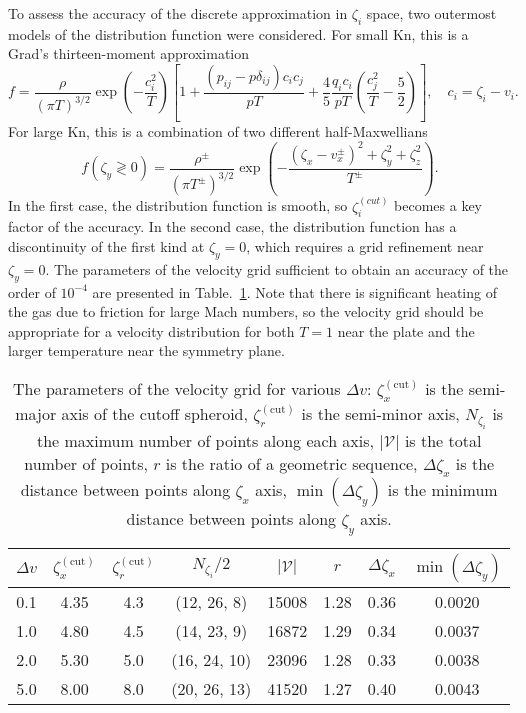 \documentclass[aip,pof,preprint]{revtex4-1}
\newcommand{\Kn}{\mathrm{Kn}}
\begin{document}
To assess the accuracy of the discrete approximation in \(\zeta_i\) space,
two outermost models of the distribution function were considered.
For small \(\Kn\), this is a Grad's thirteen-moment approximation
\begin{equation}\label{eq:grad13}
    f = \frac{\rho}{(\pi T)^{3/2}}\exp\left(-\frac{c_i^2}{ T}\right)
    \left[ 1 + \frac{(p_{ij}-p\delta_{ij})c_ic_j}{pT} + \frac4{5}\frac{q_ic_i}{pT}\left(\frac{c_j^2}{T}-\frac5{2}\right) \right],
    \quad c_i = \zeta_i - v_i.
\end{equation}
For large \(\Kn\), this is a combination of two different half-Maxwellians
\begin{equation}\label{eq:double_Maxwell}
    f(\zeta_y\gtrless0) = \frac{\rho^\pm}{(\pi T^\pm)^{3/2}}\exp\left(-\frac{(\zeta_x-v_x^\pm)^2+\zeta_y^2+\zeta_z^2}{T^\pm}\right).
\end{equation}
In the first case, the distribution function is smooth,
so \(\zeta_i^{(cut)}\) becomes a key factor of the accuracy.
In the second case, the distribution function has a discontinuity of the first kind at \(\zeta_y=0\),
which requires a grid refinement near \(\zeta_y=0\).
The parameters of the velocity grid sufficient to obtain an accuracy of the order of \(10^{-4}\)
are presented in Table.~\ref{table:velocity_grid}.
Note that there is significant heating of the gas due to friction for large Mach numbers,
so the velocity grid should be appropriate for a velocity distribution
for both \(T=1\) near the plate and the larger temperature near the symmetry plane.

\begin{table}
    \centering
    \begin{tabular}{|c|c|c|c|c|c|c|c|}
        \hline
        \(\Delta{v}\) & \(\zeta^{(\mathrm{cut})}_x\) & \(\zeta^{(\mathrm{cut})}_r\)
            & \(N_{\zeta_i}/2\) & \(|\mathcal{V}|\) & \(r\) & \(\Delta\zeta_x\) & \(\min(\Delta\zeta_y)\) \\ \hline
        0.1 & 4.35 & 4.3 & (12, 26, 8)  & 15008 & 1.28 & 0.36 & 0.0020 \\ \hline
        1.0 & 4.80 & 4.5 & (14, 23, 9)  & 16872 & 1.29 & 0.34 & 0.0037 \\ \hline
        2.0 & 5.30 & 5.0 & (16, 24, 10) & 23096 & 1.28 & 0.33 & 0.0038 \\ \hline
        5.0 & 8.00 & 8.0 & (20, 26, 13) & 41520 & 1.27 & 0.40 & 0.0043 \\ \hline
    \end{tabular}
    \caption{The parameters of the velocity grid for various \(\Delta{v}\):
        \(\zeta^{(\mathrm{cut})}_x\) is the semi-major axis of the cutoff spheroid,
        \(\zeta^{(\mathrm{cut})}_r\) is the semi-minor axis,
        \(N_{\zeta_i}\) is the maximum number of points along each axis,
        \(|\mathcal{V}|\) is the total number of points,
        \(r\) is the ratio of a geometric sequence,
        \(\Delta\zeta_x\) is the distance between points along \(\zeta_x\) axis,
        \(\min(\Delta\zeta_y)\) is the minimum distance between points along \(\zeta_y\) axis.}
    \label{table:velocity_grid}
\end{table}
\end{document}
